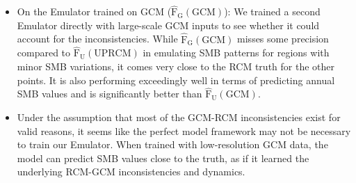 \documentclass[a4paper,11pt,oneside]{report}
\begin{document}
\begin{itemize}
     \item On the Emulator trained on GCM ($\mathrm{\hat{F}_{G}(GCM)}$): We trained a second Emulator directly with large-scale GCM inputs to see whether it could account for the inconsistencies. While $\mathrm{\hat{F}_{G}(GCM)}$ misses some precision compared to $\mathrm{\hat{F}_{U}(UPRCM)}$ in emulating SMB patterns for regions with minor SMB variations, it comes very close to the RCM truth for the other points. It is also performing exceedingly well in terms of predicting annual SMB values and is significantly better than $\mathrm{\hat{F}_{U}(GCM)}$. 
     \item Under the assumption that most of the GCM-RCM inconsistencies exist for valid reasons, it seems like the perfect model framework may not be necessary to train our Emulator. When trained with low-resolution GCM data, the model can predict SMB values close to the truth, as if it learned the underlying RCM-GCM inconsistencies and dynamics.   
\end{itemize}
\end{document}
